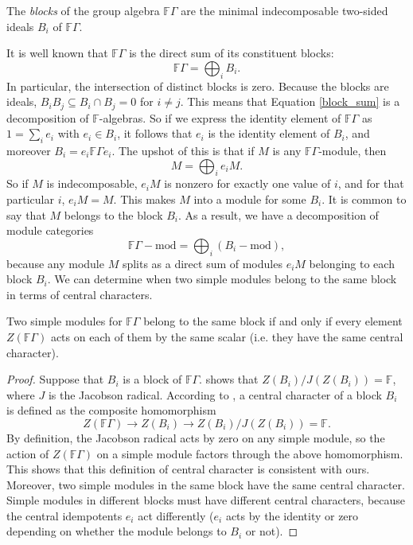 \documentclass[ALCO,Unicode]{cedram}
\begin{document}
\begin{definition}
The \emph{blocks} of the group algebra $\mathbb{F}\Gamma$ are the minimal indecomposable two-sided ideals $B_i$ of $\mathbb{F}\Gamma$.
\end{definition}

It is well known that $\mathbb{F}\Gamma$ is the direct sum of its constituent blocks:
\begin{equation} \label{block_sum}
\mathbb{F}\Gamma = \bigoplus_i B_i.
\end{equation}
In particular, the intersection of distinct blocks is zero. Because the blocks are ideals, $B_i B_j \subseteq B_i \cap B_j = 0$ for $i \neq j$. This means that Equation \eqref{block_sum} is a decomposition of $\mathbb{F}$-algebras. So if we express the identity element of $\mathbb{F}\Gamma$ as $1 = \sum_i e_i$ with $e_i \in B_i$, it follows that $e_i$ is the identity element of $B_i$, and moreover $B_i = e_i \mathbb{F}\Gamma e_i$. The upshot of this is that if $M$ is any $\mathbb{F}\Gamma$-module, then
\[
M = \bigoplus_i e_i M.
\]
So if $M$ is indecomposable, $e_i M$ is nonzero for exactly one value of $i$, and for that particular $i$, $e_i M = M$. This makes $M$ into a module for some $B_i$. It is common to say that $M$ belongs to the block $B_i$. As a result, we have a decomposition of module categories
\[
\mathbb{F}\Gamma - \mathrm{mod} = \bigoplus_i \left(B_i -\mathrm{mod}\right),
\]
because any module $M$ splits as a direct sum of modules $e_iM$ belonging to each block $B_i$. We can determine when two simple modules belong to the same block in terms of central characters.

\begin{proposition} \label{central_char_blocks}
Two simple modules for $\mathbb{F}\Gamma$ belong to the same block if and only if every element $Z(\mathbb{F}\Gamma)$ acts on each of them by the same scalar \textup{(}i.e. they have the same central character\textup{)}. 
\end{proposition}
\begin{proof}
Suppose that $B_i$ is a block of $\mathbb{F}\Gamma$.  \cite[Lemma 4.1]{modrepfingrp} shows that $Z(B_i)/J(Z(B_i)) = \mathbb{F}$, where $J$ is the Jacobson radical. According to  \cite{modrepfingrp}, a central character of a block $B_i$ is defined as the composite homomorphism
\[
Z(\mathbb{F}\Gamma) \to Z(B_i) \to Z(B_i)/J(Z(B_i)) = \mathbb{F}.
\]
By definition, the Jacobson radical acts by zero on any simple module, so the action of $Z(\mathbb{F}\Gamma)$ on a simple module factors through the above homomorphism. This shows that this definition of central character is consistent with ours. Moreover, two simple modules in the same block have the same central character. Simple modules in different blocks must have different central characters, because the central idempotents $e_i$ act differently ($e_i$ acts by the identity or zero depending on whether the module belongs to $B_i$ or not).
\end{proof}
\end{document}
